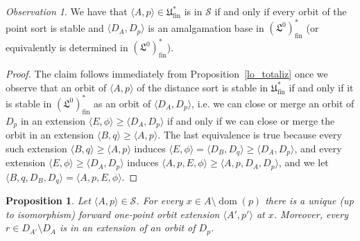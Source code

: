 \documentclass[oneside,notitlepage,12pt]{article}
\newtheorem{prop}[tw]{Proposition}
\theoremstyle{definition}
\theoremstyle{remark}
\newtheorem{observation}[tw]{Observation}
\newcommand \seq [1]{\langle #1 \rangle}
\newcommand \dom {\operatorname{dom}}
\newcommand \Su {\mathscr{S}}
\newcommand \fin {{\operatorname{fin}}}
\newcommand \Lin {\mathfrak{L}}
\newcommand \Ult {\mathfrak{U}}
\begin{document}
\begin{observation} \label{distance_sort_stable}
    We have that $\seq{A, p} \in \Ult^*_\fin$ is in $\Su$ if and only if every orbit of the point sort is stable and $\seq{D_A, D_p}$ is an amalgamation base in $(\Lin^0)^*_\fin$ (or equivalently is determined in $(\Lin^0)^*_\fin$).
\end{observation}
\begin{proof}
    The claim follows immediately from Proposition~\ref{lo_totaliz} once we observe that an orbit of $\seq{A, p}$ of the distance sort is stable in $\Ult^*_\fin$ if and only if it is stable in $(\Lin^0)^*_\fin$ as an orbit of $\seq{D_A, D_p}$, i.e. we can close or merge an orbit of $D_p$ in an extension $\seq{E, \phi} \geq \seq{D_A, D_p}$ if and only if we can close or merge the orbit in an extension $\seq{B, q} \geq \seq{A, p}$.
    The last equivalence is true because every such extension $\seq{B, q} \geq \seq{A, p}$ induces $\seq{E, \phi} = \seq{D_B, D_q} \geq \seq{D_A, D_p}$, and every extension $\seq{E, \phi} \geq \seq{D_A, D_p}$ induces $\seq{A, p, E, \phi} \geq \seq{A, p, D_A, D_p}$, and we let $\seq{B, q, D_B, D_q} = \seq{A, p, E, \phi}$.
\end{proof}

\begin{prop} \label{thm:unique_onepoint_extension}
    Let $\seq{A, p} \in \Su$.
    For every $x \in A \setminus \dom(p)$ there is a unique (up to isomorphism) forward one-point orbit extension $\seq{A', p'}$ at $x$.
    Moreover, every $r \in D_{A'} \setminus D_A$ is in an extension of an orbit of $D_p$.
\end{prop}
\end{document}
